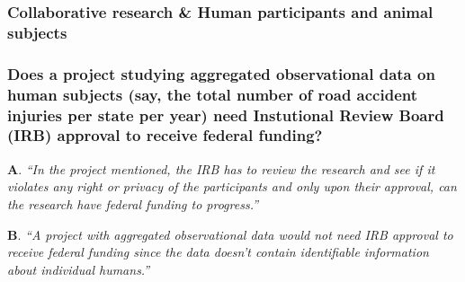 \documentclass[12pt]{beamer}
\newcommand\ans[1]{{\it ``#1''}}
\newcommand\gap{\vspace{5mm}}
\begin{document}

\begin{frame}
\frametitle{Collaborative research \& Human participants and animal subjects}
\end{frame}

\begin{frame} %
\frametitle{Does a project studying aggregated observational data on human subjects (say, the total number of road accident injuries per state per year) need Instutional Review Board (IRB) approval to receive federal funding?
}

{\bf A}. \ans{In the project mentioned, the IRB has to review the research and see if it violates any right or privacy of the participants and only upon their approval, can the research have federal funding to progress.}

\gap

{\bf B}. \ans{A project with aggregated observational data would not need IRB approval to receive federal funding since the data doesn’t contain identifiable information about individual humans.}










\end{frame}
\end{document}
